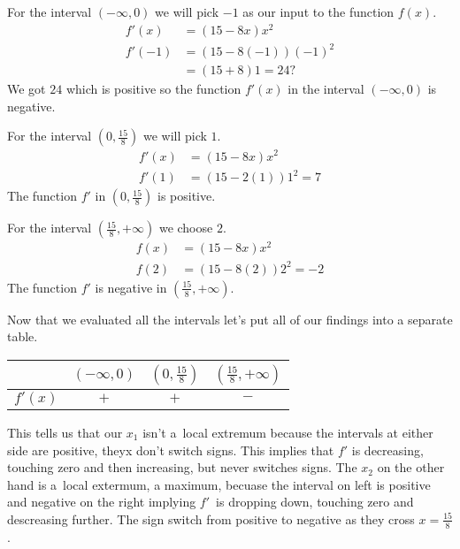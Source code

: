         \begin{center}
            For the interval $(-\infty, 0)$ we will pick $-1$ as our
            input to the function $f(x)$.
            \begin{align*}
                f'(x) &= (15 - 8x)x^{2} \\
                f'(-1) &= (15 - 8(-1))(-1)^{2} \\
                &= (15 + 8)1 
                = 24?
            \end{align*}
            We got $24$ which is positive so the function $f'(x)$ in 
            the interval $(-\infty, 0)$ is negative.

            \clearpage

            For the interval $(0, \frac{15}{8})$ we will pick $1$.
            \begin{align*}
                f'(x) &= (15 - 8x)x^{2} \\
                f'(1) &= (15 - 2(1))1^{2} 
                = 7
            \end{align*}
            The function $f'$ in $(0, \frac{15}{8})$ is positive.
        
            \vspace{0.5cm}

            For the interval $(\frac{15}{8}, +\infty)$ we choose $2$.
            \begin{align*}
                f(x) &= (15 - 8x)x^{2} \\
                f(2) &= (15 - 8(2))2^{2} 
                = -2
            \end{align*}
            The function $f'$ is negative in $(\frac{15}{8}, +\infty)$.
        \end{center}

        Now that we evaluated all the intervals 
        let's put all of our findings into a separate table.
        
        \begin{center}
            \begin{tabular}{|c|c|c|c|}
                \hline
                & $(-\infty, 0)$ & $(0, \frac{15}{8})$ & $(\frac{15}{8}, +\infty)$ \\ \hline
                $f'(x)$ & $+$ & $+$ & $-$ \\ \hline
            \end{tabular}
        \end{center}
        
        This tells us that our $x_{1}$ isn't a~local extremum because
        the intervals at either side are positive, theyx don't
        switch signs. This implies that $f'$ is decreasing, 
        touching zero and then increasing, but never switches signs.
        The $x_{2}$ on the other hand is a~local extermum, a maximum, becuase 
        the interval on left is positive and negative on the right 
        implying $f'$~is dropping down, touching zero and descreasing 
        further. The sign switch from positive to negative as they cross
        $x = \frac{15}{8}$.
        \clearpage

